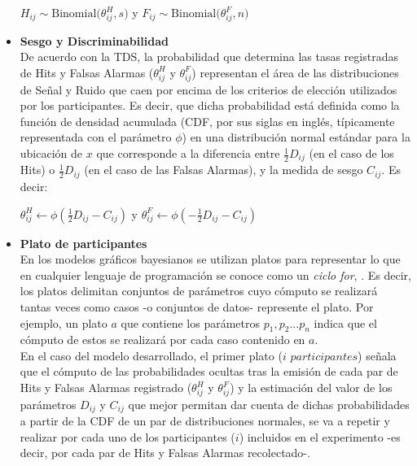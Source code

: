 \begin{itemize}
\begin{center}
$H_{ij}\sim \mathrm{Binomial}\bigl(\theta^H_{ij}, s)$
y
$F_{ij}\sim \mathrm{Binomial}\bigl(\theta^F_{ij}, n)$\\
\end{center}

\item \textbf{Sesgo y Discriminabilidad}\\

De acuerdo con la TDS, la probabilidad que determina las tasas registradas de Hits y Falsas Alarmas ($\theta^H_{ij}$ y $\theta^F_{ij}$) representan el área de las distribuciones de Señal y Ruido que caen por encima de los criterios de elección utilizados por los participantes. Es decir, que dicha probabilidad está definida como la función de densidad acumulada (CDF, por sus siglas en inglés, típicamente representada con el parámetro $\phi$) en una distribución normal estándar para la ubicación de $x$ que corresponde a la diferencia entre $\frac{1}{2}D_{ij}$ (en el caso de los Hits) o $\frac{1}{2}D_{ij}$ (en el caso de las Falsas Alarmas), y la medida de sesgo $C_{ij}$. Es decir:\\

\begin{center}
$\theta^H_{ij}\gets \phi (\frac{1}{2}D_{ij}-C_{ij})$
y
$\theta^F_{ij}\gets \phi (-\frac{1}{2}D_{ij}-C_{ij})$\\
\end{center}

\CONSIDERAR \AGREGAR \UNA \FIGURA \ILUSTRATIVA

\item \textbf{Plato de participantes}\\

En los modelos gráficos bayesianos se utilizan platos para representar lo que en cualquier lenguaje de programación se conoce como un \textit{ciclo for}, \parencite{LeeBook}. Es decir, los platos delimitan conjuntos de parámetros cuyo cómputo se realizará tantas veces como casos -o conjuntos de datos- represente el plato. Por ejemplo, un plato $a$ que contiene los parámetros $p_1, p_2... p_n$ indica que el cómputo de estos se realizará por cada caso contenido en $a$.\\

En el caso del modelo desarrollado, el primer plato ($i$ $participantes$) señala que el cómputo de las probabilidades ocultas tras la emisión de cada par de Hits y Falsas Alarmas registrado ($\theta^H_{ij}$ y $\theta^F_{ij}$) y la estimación del valor de los parámetros $D_{ij}$ y $C_{ij}$ que mejor permitan dar cuenta de dichas probabilidades a partir de la CDF de un par de distribuciones normales, se va a repetir y realizar por cada uno de los participantes ($i$) incluidos en el experimento -es decir, por cada par de Hits y Falsas Alarmas recolectado-.\\


\end{itemize}
